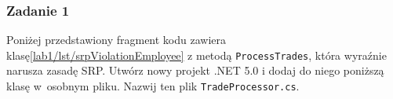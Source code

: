 





\subsubsection{Zadanie 1}

Poniżej przedstawiony fragment kodu\cite{adaptatywny_kod_hall} zawiera klasę\ref{lab1/lst/srpViolationEmployee} z metodą \texttt{ProcessTrades}, która wyraźnie narusza zasadę SRP. Utwórz nowy projekt .NET 5.0 i dodaj do niego poniższą klasę w~osobnym pliku. Nazwij ten plik \texttt{TradeProcessor.cs}.

